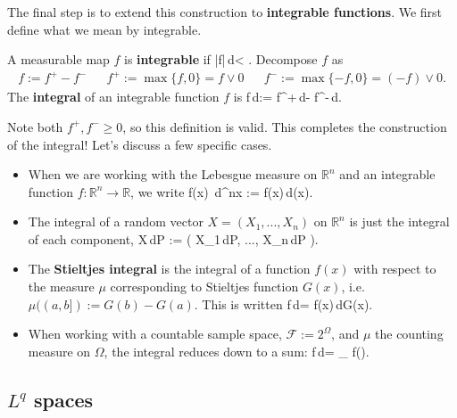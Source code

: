 The final step is to extend this construction to \textbf{integrable functions}. We first define what we mean by integrable.
\begin{definition}
	A measurable map $f$ is \textbf{integrable} if 
	\eq
		\int |f|\,d\mu < \infty.
	\qe
	Decompose $f$ as
	\begin{align}
		f := f^+ - f^- && f^+ := \max\{f, 0\} = f\vee 0 && f^- := \max\{-f, 0\} = (-f)\vee 0.
	\end{align}
	The \textbf{integral} of an integrable function $f$ is
	\eq
		\int f\,d\mu := \int f^+\,d\mu - \int f^-\,d\mu.
	\qe
\end{definition}
Note both $f^+, f^-\geq 0$, so this definition is valid. This completes the construction of the integral! Let's discuss a few specific cases. 
\begin{itemize}
	\item When we are working with the Lebesgue measure on $\mathbb R^n$ and an integrable function $f : \mathbb R^n\rightarrow\mathbb R$, we write
	\eq
		\int f(x)\, d^nx := \int f(x)\,d\Leb (x).
	\qe
	\item The integral of a random vector $X = (X_1, ..., X_n)$ on $\mathbb R^n$ is just the integral of each component,
	\eq
		\int X\,d\mathbb P := \left( \int X_1\,d\mathbb P, ..., \int X_n\,d\mathbb P \right).
	\qe
	\item The \textbf{Stieltjes integral} is the integral of a function $f(x)$ with respect to the measure $\mu$ corresponding to Stieltjes function $G(x)$, i.e. $\mu((a, b]) := G(b) - G(a)$. This is written
	\eq
		\int f\,d\mu = \int f(x)\,dG(x).
	\qe
	\item When working with a countable sample space, $\mathcal F := 2^\Omega$, and $\mu$ the counting measure on $\Omega$, the integral reduces down to a sum:
	\eq
		\int f\,d\mu = \sum_{\omega\in\Omega} f(\omega).
	\qe
\end{itemize}


\subsection{$L^q$ spaces}


